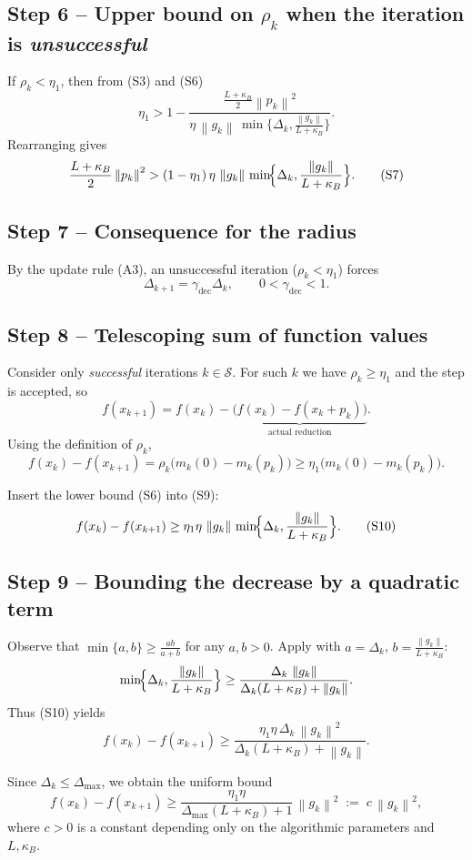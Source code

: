 \documentclass[11pt]{article}
\newcommand{\norm}[1]{\left\lVert#1\right\rVert}
\begin{document}
\subsection*{Step 6 – Upper bound on $\rho_k$ when the iteration is \emph{unsuccessful}}
If $\rho_k<\eta_1$, then from (S3) and (S6)
\[
\eta_1
> 1-\frac{\frac{L+\kappa_B}{2}\norm{p_k}^{2}}{\eta\,\norm{g_k}\,\min\!\{\Delta_k,\frac{\norm{g_k}}{L+\kappa_B}\}} .
\]
Rearranging gives
\[
\frac{L+\kappa_B}{2}\norm{p_k}^{2}
> (1-\eta_1)\,\eta\,\norm{g_k}\,\min\!\Bigl\{\Delta_k,\frac{\norm{g_k}}{L+\kappa_B}\Bigr\}.
\tag{S7}
\]

\subsection*{Step 7 – Consequence for the radius}
By the update rule (A3), an unsuccessful iteration ($\rho_k<\eta_1$) forces
\[
\Delta_{k+1}= \gamma_{\text{dec}}\Delta_k,\qquad 0<\gamma_{\text{dec}}<1.
\tag{S8}
\]

\subsection*{Step 8 – Telescoping sum of function values}
Consider only \emph{successful} iterations $k\in\mathcal{S}$. For such $k$ we have $\rho_k\ge\eta_1$ and the step is accepted, so
\[
f(x_{k+1}) = f(x_k) - \underbrace{\bigl(f(x_k)-f(x_k+p_k)\bigr)}_{\text{actual reduction}} .
\]
Using the definition of $\rho_k$,
\[
f(x_k)-f(x_{k+1})
= \rho_k\bigl(m_k(0)-m_k(p_k)\bigr)
\ge \eta_1\bigl(m_k(0)-m_k(p_k)\bigr).
\tag{S9}
\]

Insert the lower bound (S6) into (S9):
\[
f(x_k)-f(x_{k+1})
\ge \eta_1\eta\,\norm{g_k}\,\min\!\Bigl\{\Delta_k,\frac{\norm{g_k}}{L+\kappa_B}\Bigr\}.
\tag{S10}
\]

\subsection*{Step 9 – Bounding the decrease by a quadratic term}
Observe that $\min\{a,b\}\ge \frac{ab}{a+b}$ for any $a,b>0$. Apply with 
$a=\Delta_k$, $b=\frac{\norm{g_k}}{L+\kappa_B}$:
\[
\min\!\Bigl\{\Delta_k,\frac{\norm{g_k}}{L+\kappa_B}\Bigr\}
\ge
\frac{\Delta_k\,\norm{g_k}}{\Delta_k(L+\kappa_B)+\norm{g_k}} .
\]
Thus (S10) yields
\[
f(x_k)-f(x_{k+1})
\ge
\frac{\eta_1\eta\,\Delta_k\,\norm{g_k}^{2}}{\Delta_k(L+\kappa_B)+\norm{g_k}} .
\tag{S11}
\]

Since $\Delta_k\le\Delta_{\max}$, we obtain the uniform bound
\[
f(x_k)-f(x_{k+1})
\ge
\frac{\eta_1\eta}{\Delta_{\max}(L+\kappa_B)+1}\,\norm{g_k}^{2}
\;:=\;c\,\norm{g_k}^{2},
\tag{S12}
\]
where $c>0$ is a constant depending only on the algorithmic parameters and $L,\kappa_B$.
\end{document}
